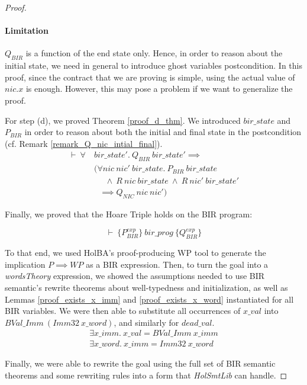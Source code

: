 \documentclass[10pt,a4paper]{article}
\newcommand{\htriple}[3]{\ensuremath{\{#1\}~#2~\{#3\}}}
\begin{document}
\begin{multicols}{2}
\begin{proof}
\paragraph{Limitation} $Q_{BIR}$ is a function of the end state only. Hence, in order to reason about the initial state, we need in general to introduce ghost variables postcondition. In this proof, since the contract that we are proving is simple, using the actual value of $nic.x$ is enough. However, this may pose a problem if we want to generalize the proof.

For step (d), we proved Theorem \ref{proof_d_thm}. We introduced $bir\_state$ and $P_{BIR}$ in order to reason about both the initial and final state in the postcondition (cf. Remark \ref{remark_Q_nic_intial_final}).
%
\begin{equation} \label{proof_d_thm}
\begin{split}
\vdash~\forall~&bir\_state'.~Q_{BIR}~bir\_state' \implies\\
	&(\forall nic~nic'~bir\_state.~P_{BIR}~bir\_state\\
	&~~~~~~\land~R~nic~bir\_state~\land~R~nic'~bir\_state'\\
	&~~~\implies Q_{NIC}~nic~nic')
\end{split}
\end{equation}

Finally, we proved that the Hoare Triple holds on the BIR program:

\begin{equation} \label{proof_ht_thm}
\vdash~\htriple{P^{exp}_{BIR}}{bir\_prog}{Q^{exp}_{BIR}}
\end{equation}

To that end, we used HolBA's proof-producing WP tool to generate the implication $P \implies WP$ as a BIR expression. Then, to turn the goal into a \textit{wordsTheory} expression, we showed the assumptions needed to use BIR semantic's rewrite theorems about well-typedness and initialization, as well as Lemmas \ref{proof_exists_x_imm} and \ref{proof_exists_x_word} instantiated for all BIR variables. We were then able to substitute all occurrences of $x\_val$ into $BVal\_Imm~(Imm32~x\_word)$, and similarly for $dead\_val$.
%
\begin{align}
  \label{proof_exists_x_imm}
  \exists x\_imm.~x\_val = BVal\_Imm~x\_imm\\
  \label{proof_exists_x_word}
  \exists x\_word.~x\_imm = Imm32~x\_word
\end{align}

Finally, we were able to rewrite the goal using the full set of BIR semantic theorems and some rewriting rules into a form that \textit{HolSmtLib} can handle.


\end{proof}
\end{multicols}
\end{document}

